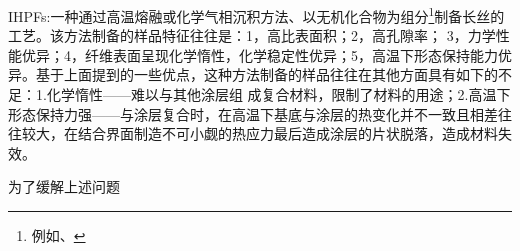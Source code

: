 IHPFs:一种通过高温熔融或化学气相沉积方法、以无机化合物为组分\footnote{例如、}制备长丝的工艺。该方法制备的样品特征往往是：1，高比表面积；2，高孔隙率；
3，力学性能优异；4，纤维表面呈现化学惰性，化学稳定性优异；5，高温下形态保持能力优异。基于上面提到的一些优点，这种方法制备的样品往往在其他方面具有如下的不足：1.化学惰性——难以与其他涂层组
成复合材料，限制了材料的用途；2.高温下形态保持力强——与涂层复合时，在高温下基底与涂层的热变化并不一致且相差往往较大，在结合界面制造不可小觑的热应力最后造成涂层的片状脱落，造成材料失效。

为了缓解上述问题